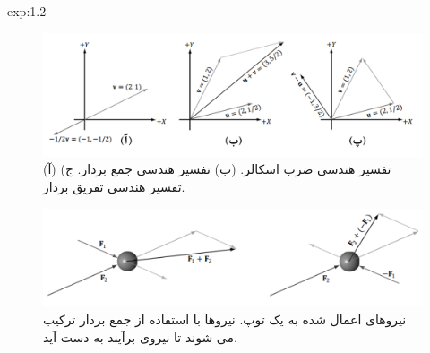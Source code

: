 {\begin{spacing}{1.5}
\begin{example}{exp:1.2}
            \begin{figure}[H]
                \centering
                \setlength{\belowcaptionskip}{-10pt}
                \includegraphics[width=\textwidth]{Images/4/1/4.Session.1.1.6}
                \caption{(آ) تفسیر هندسی ضرب اسکالر. (ب) تفسیر هندسی جمع بردار. ج) تفسیر هندسی تفریق بردار.}
                \label{fig:4.Session.1.1.6}
            \end{figure}

            \begin{figure}[H]
                \centering
                \setlength{\belowcaptionskip}{-10pt}
                \includegraphics[width=\textwidth]{Images/4/1/4.Session.1.1.7}
                \caption{نیروهای اعمال شده به یک توپ. نیروها با استفاده از جمع بردار ترکیب می شوند تا نیروی برآیند به دست آید. \textbf{\vspace{10pt}}}
                \label{fig:4.Session.1.1.7}
            \end{figure}
        \end{example}
    \end{spacing}
}

